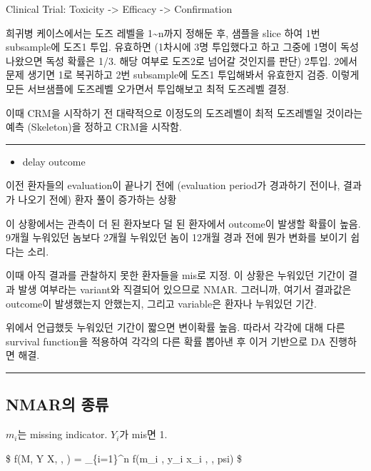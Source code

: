 \documentclass[
]{book}
\providecommand{\tightlist}{%
  \setlength{\itemsep}{0pt}\setlength{\parskip}{0pt}}
\begin{document}
Clinical Trial: Toxicity -\textgreater{} Efficacy -\textgreater{} Confirmation

희귀병 케이스에서는 도즈 레벨을 1\textasciitilde n까지 정해둔 후, 샘플을 slice 하여 1번 subsample에 도즈1 투입. 유효하면 (1차시에 3명 투입했다고 하고 그중에 1명이 독성 나왔으면 독성 확률은 1/3. 해당 여부로 도즈2로 넘어갈 것인지를 판단) 2투입. 2에서 문제 생기면 1로 복귀하고 2번 subsample에 도즈1 투입해봐서 유효한지 검증. 이렇게 모든 서브샘플에 도즈레벨 오가면서 투입해보고 최적 도즈레벨 결정.

이때 CRM을 시작하기 전 대략적으로 이정도의 도즈레벨이 최적 도즈레벨일 것이라는 예측 (Skeleton)을 정하고 CRM을 시작함.

\begin{center}\rule{0.5\linewidth}{0.5pt}\end{center}

\begin{itemize}
\tightlist
\item
  delay outcome
\end{itemize}

이전 환자들의 evaluation이 끝나기 전에 (evaluation period가 경과하기 전이나, 결과가 나오기 전에) 환자 풀이 증가하는 상황

이 상황에서는 관측이 더 된 환자보다 덜 된 환자에서 outcome이 발생할 확률이 높음. 9개월 누워있던 놈보다 2개월 누워있던 놈이 12개월 경과 전에 뭔가 변화를 보이기 쉽다는 소리.

이때 아직 결과를 관찰하지 못한 환자들을 mis로 지정. 이 상황은 누워있던 기간이 결과 발생 여부라는 variant와 직결되어 있으므로 NMAR. 그러니까, 여기서 결과값은 outcome이 발생했는지 안했는지, 그리고 variable은 환자나 누워있던 기간.

위에서 언급했듯 누워있던 기간이 짧으면 변이확률 높음. 따라서 각각에 대해 다른 survival function을 적용하여 각각의 다른 확률 뽑아낸 후 이거 기반으로 DA 진행하면 해결.

\begin{center}\rule{0.5\linewidth}{0.5pt}\end{center}

\hypertarget{nmaruxc758-uxc885uxb958}{%
\subsection{NMAR의 종류}\label{nmaruxc758-uxc885uxb958}}

\(m_i\)는 missing indicator. \(Y_i\)가 mis면 1.

\$
f(M, Y \vert X, \theta, \psi) = \prod\_\{i=1\}\^{}n f(m\_i , y\_i \vert x\_i , \theta, psi)
\$
\end{document}
